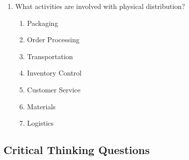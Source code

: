\begin{enumerate}
      \paragraph{Indirect Distribution:} A manufacturer uses a wholesaler or
        retailer to sell their products
  \item What activities are involved with physical distribution?
      \begin{enumerate}
        \item Packaging
        \item Order Processing
        \item Transportation
        \item Inventory Control
        \item Customer Service
        \item Materials
        \item Logistics
      \end{enumerate}
\end{enumerate}

\subsection{Critical Thinking Questions}

